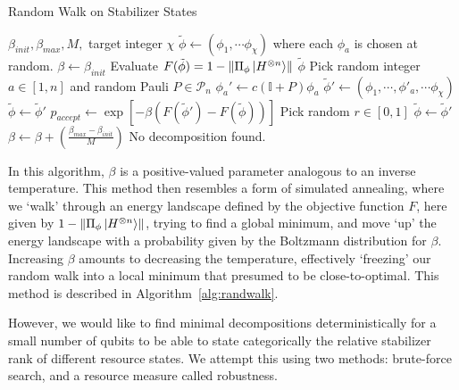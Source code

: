 \documentclass{standalone}
\begin{document}
\begin{algorithm}[!h]
\caption{Random Walk on Stabilizer States}
\label{alg:randwalk}
\begin{algorithmic}[1]
\Require $\beta_{init},\beta_{max},M,$ target integer $\chi$
\State $\tilde{\phi} \leftarrow \left(\phi_{1},\cdots\phi_{\chi}\right)$ where each $\phi_{a}$ is chosen at random.
\State $\beta \leftarrow \beta_{init}$
        \State Evaluate $F(\tilde{\phi})=1-\norm{\Pi_{\phi}\ket{H^{\otimes n}}}$
            \State \Return $\tilde{\phi}$
        \EndIf
        \State Pick random integer $a\in[1,n]$ and random Pauli $P\in\mathcal{P}_{n}$
        \State $\phi_{a}'\leftarrow c\left(\mathbb{I}+P\right)\phi_{a}$
        \State $\tilde{\phi}' \leftarrow (\phi_{1},\cdots,\phi'_{a},\cdots\phi_{\chi})$ 
            \State $\tilde{\phi}\leftarrow\tilde{\phi}'$
        \Else
            \State $p_{accept}\leftarrow \exp[-\beta\left(F(\tilde{\phi}')-F(\tilde{\phi})\right)]$
            \State Pick random $r\in [0,1]$
                \State $\tilde{\phi}\leftarrow\tilde{\phi}'$
            \EndIf
        \EndIf
    \EndFor
    \State $\beta\leftarrow \beta + \left( \frac{\beta_{max}-\beta_{init}}{M} \right)$
\EndWhile
\State \Return No decomposition found.
\end{algorithmic}
\end{algorithm}
In this algorithm, $\beta$ is a positive-valued parameter analogous to an inverse temperature. This method then resembles a form of simulated annealing, where we `walk' through an energy landscape defined by the objective function $F$, here given by $1-\norm{\Pi_{\phi}\ket{H^{\otimes n}}}$, trying to find a global minimum, and move `up' the energy landscape with a probability given by the Boltzmann distribution for $\beta$. Increasing $\beta$ amounts to decreasing the temperature, effectively `freezing' our random walk into a local minimum that presumed to be close-to-optimal. This method is described in Algorithm~\ref{alg:randwalk}.
\par
However, we would like to find minimal decompositions deterministically for a small number of qubits to be able to state categorically the relative stabilizer rank of different resource states. We attempt this using two methods: brute-force search, and a resource measure called robustness.
\end{document}
